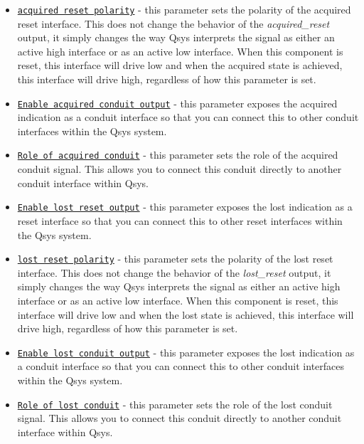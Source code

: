 \documentclass{article}
\begin{document}
\begin{flushleft}
\begin{itemize}
\item \texttt{\underline{acquired reset polarity}} - this parameter sets the polarity of the acquired reset interface.  This does not change the behavior of the \emph{acquired\_reset} output, it simply changes the way Qsys interprets the signal as either an active high  interface or as an active low  interface.  When this component is reset, this interface will drive low and when the acquired state is achieved, this interface will drive high, regardless of how this parameter is set.

\item \texttt{\underline{Enable acquired conduit output}} - this parameter exposes the acquired indication as a conduit interface so that you can connect this to other conduit interfaces within the Qsys system.

\item \texttt{\underline{Role of acquired conduit}} - this parameter sets the role of the acquired conduit signal.  This allows you to connect this conduit directly to another conduit interface within Qsys.

\item \texttt{\underline{Enable lost reset output}} - this parameter exposes the lost indication as a reset interface so that you can connect this to other reset interfaces within the Qsys system.

\item \texttt{\underline{lost reset polarity}} - this parameter sets the polarity of the lost reset interface.  This does not change the behavior of the \emph{lost\_reset} output, it simply changes the way Qsys interprets the signal as either an active high  interface or as an active low  interface.  When this component is reset, this interface will drive low and when the lost state is achieved, this interface will drive high, regardless of how this parameter is set.

\item \texttt{\underline{Enable lost conduit output}} - this parameter exposes the lost indication as a conduit interface so that you can connect this to other conduit interfaces within the Qsys system.

\item \texttt{\underline{Role of lost conduit}} - this parameter sets the role of the lost conduit signal.  This allows you to connect this conduit directly to another conduit interface within Qsys.


\end{itemize}
\end{flushleft}
\end{document}
